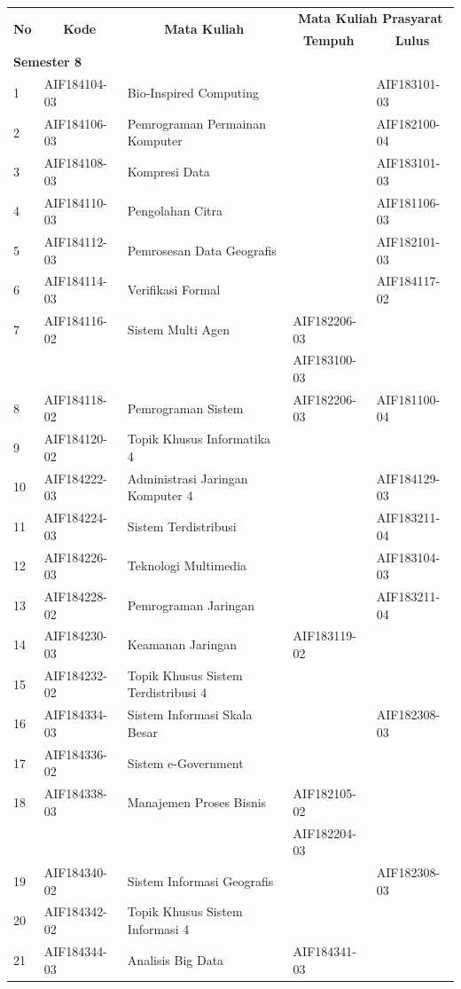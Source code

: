 \begin{table}[H]
	\centering
		\begin{tabular}{|p{0.5cm}|p{2.85cm}|p{4.95cm}|p{2.7cm}|p{2.7cm}|}
			\hline
			\multicolumn{1}{|c|}{\multirow{2}{*}{\textbf{No}}} & \multicolumn{1}{c|}{\multirow{2}{*}{\textbf{Kode}}} & \multicolumn{1}{c|}{\multirow{2}{*}{\textbf{Mata Kuliah}}} & \multicolumn{2}{c|}{\textbf{Mata Kuliah Prasyarat}} \\ \cline{4-5}
			 &  &  & \multicolumn{1}{c|}{\textbf{Tempuh}} & \multicolumn{1}{c|}{\textbf{Lulus}} \\ \hline
\multicolumn{5}{|l|}{\textbf{Semester 8}} \\ \hline
1 & AIF184104-03 & Bio-Inspired Computing &  & AIF183101-03 \\ \hline
2 & AIF184106-03 & Pemrograman Permainan Komputer &  & AIF182100-04 \\ \hline
3 & AIF184108-03 & Kompresi Data &  & AIF183101-03 \\ \hline
4 & AIF184110-03 & Pengolahan Citra &  & AIF181106-03 \\ \hline
5 & AIF184112-03 & Pemrosesan Data Geografis &  & AIF182101-03 \\ \hline
6 & AIF184114-03 & Verifikasi Formal &  & AIF184117-02 \\ \hline
7 & AIF184116-02 & Sistem Multi Agen & AIF182206-03 &  \\
 &  &  & AIF183100-03 &  \\ \hline
8 & AIF184118-02 & Pemrograman Sistem & AIF182206-03 & AIF181100-04 \\ \hline
9 & AIF184120-02 & Topik Khusus Informatika 4 &  &  \\ \hline
10 & AIF184222-03 & Administrasi Jaringan Komputer 4 &  & AIF184129-03 \\ \hline
11 & AIF184224-03 & Sistem Terdistribusi &  & AIF183211-04 \\ \hline
12 & AIF184226-03 & Teknologi Multimedia &  & AIF183104-03 \\ \hline
13 & AIF184228-02 & Pemrograman Jaringan &  & AIF183211-04 \\ \hline
14 & AIF184230-03 & Keamanan Jaringan & AIF183119-02 &  \\ \hline
15 & AIF184232-02 & Topik Khusus Sistem Terdistribusi 4 &  &  \\ \hline
16 & AIF184334-03 & Sistem Informasi Skala Besar &  & AIF182308-03 \\ \hline
17 & AIF184336-02 & Sistem e-Government &  &  \\ \hline
18 & AIF184338-03 & Manajemen Proses Bisnis & AIF182105-02 &  \\
 &  &  & AIF182204-03 &  \\ \hline
19 & AIF184340-02 & Sistem Informasi Geografis &  & AIF182308-03 \\ \hline
20 & AIF184342-02 & Topik Khusus Sistem Informasi 4 &  &  \\ \hline
21 & AIF184344-03 & Analisis Big Data & AIF184341-03 & \\  \hline
		\end{tabular}
	\label{tab:DaftarMataKuliahWajibDanPrasyaratnya3}
\end{table}

